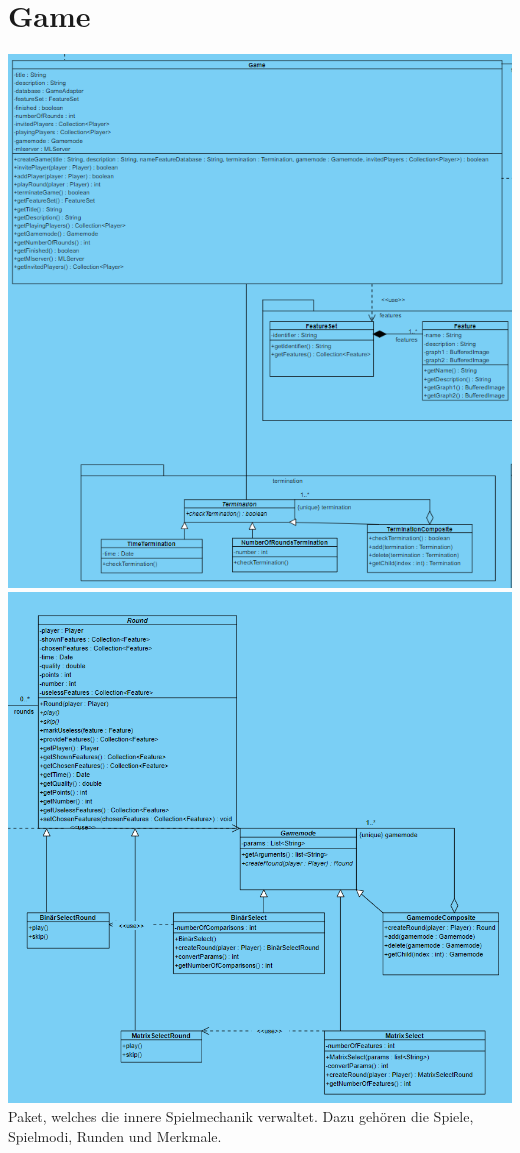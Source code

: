 \documentclass[a4paper]{scrreprt}
\begin{document}
   \section{Game}
    \includegraphics[width=\textwidth]{img/GameTerminationFeature.PNG}
    \includegraphics[width=\textwidth]{img/RoundAndGameMode.PNG}
   Paket, welches die innere Spielmechanik verwaltet. Dazu gehören die Spiele, Spielmodi, Runden und Merkmale.
   
\end{document}
